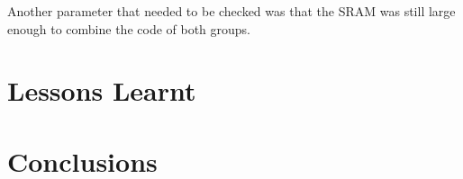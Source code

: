 \documentclass[a4paper]{article}
\begin{document}
Another parameter that needed to be checked was that the SRAM was still large enough to combine the code of both groups.\\

\section{Lessons Learnt}

\section{Conclusions}
\end{document}

